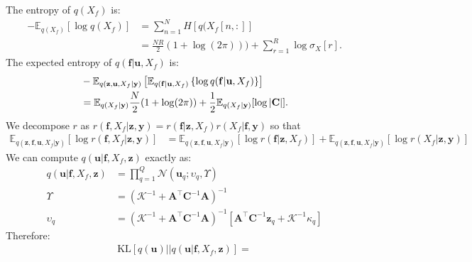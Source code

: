 \documentclass[12pt]{article}
\newcommand{\Kappa}{\mathcal{K}}
\newcommand{\ub}{\mathbf{u}}
\newcommand{\zb}{\mathbf{z}}
\newcommand{\fb}{\mathbf{f}}
\newcommand{\Cb}{\mathbf{C}}
\newcommand{\Ab}{\mathbf{A}}
\newcommand{\yb}{\mathbf{y}}
\newcommand{\Kuu}{\mathbf{K}_{uu}}
\newcommand{\Ex}{\mathbb{E}}
\newcommand{\KL}{\mathrm{KL}}
\begin{document}
%
The entropy of $q(X_f)$ is:
%
\begin{align}
-\Ex_{q(X_f)}\left[\log q(X_f)\right] &= \sum_{n=1}^N H[q(X_f[n,:]] \\
&= \frac{NR}{2}(1+\log(2\pi))) + \sum_{r=1}^R\log\sigma_X[r].
\end{align}
%
The expected entropy of $q(\fb|\ub,X_f)$ is:
%
\begin{align}
    &- \Ex_{q(\zb,\ub,X_f|\yb)}\left[ \Ex_{q(\fb|\ub,X_f)}\left\{\log q(\fb|\ub,X_f) \right\} \right] \notag \\
    &= \Ex_{q(X_f|\yb)}\frac{N}{2}(1 + \log (2\pi)) + \frac{1}{2} \Ex_{q(X_f|\yb)}[\log|\Cb|].
\end{align}
%
We decompose $r$ as $r(\fb,X_f|\zb,\yb) = r(\fb|\zb,X_f)r(X_f|\fb,\yb)$ so that
%
\begin{align}
\Ex_{q(\zb,\fb,\ub,X_f|\yb)}\left[ \log r(\fb,X_f|\zb,\yb) \right] &= \Ex_{q(\zb,\fb,\ub,X_f|\yb)}\left[\log r(\fb|\zb,X_f)\right] + \Ex_{q(\zb,\fb,\ub,X_f|\yb)}\left[\log r(X_f|\zb,\yb)\right]
\end{align}
%
We can compute $q(\ub|\fb,X_f,\zb)$ exactly as:
%
\begin{align}
q(\ub|\fb,X_f,\zb) &= \prod_{q=1}^Q \mathcal{N}(\ub_q; \upsilon_q, \Upsilon) \\
\Upsilon &= (\Kappa^{-1} + \Ab^\top\Cb^{-1}\Ab)^{-1} \\
\upsilon_q &= (\Kappa^{-1} + \Ab^\top\Cb^{-1}\Ab)^{-1}[\Ab^\top \Cb^{-1}\zb_q + \Kappa^{-1}\kappa_q]
\end{align}
%
Therefore:
%
\begin{align}
\KL\left[ q(\ub)||q(\ub|\fb,X_f,\zb) \right] =
\end{align}
%
\end{document}
